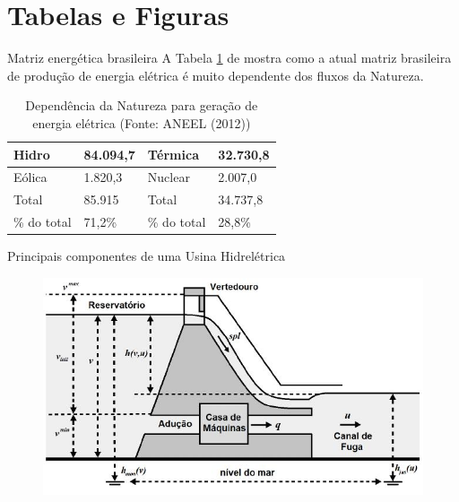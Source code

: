 \documentclass{beamer}
\begin{document}
\section{Tabelas e Figuras}

\begin{frame}{Matriz energética brasileira}
  A Tabela \ref{table:dependenciaNatureza2012} de \cite{junior1998} mostra como a atual matriz brasileira de produção de energia elétrica é muito dependente dos fluxos da Natureza.
  
  \begin{table}
  \caption{Dependência da Natureza para geração de energia elétrica (Fonte: ANEEL (2012))}
  \label{table:dependenciaNatureza2012}
  \begin{tabular}{|l|l|l|l|}
      \hline
      Hidro       & 84.094,7   & Térmica      & 32.730,8  \\ \hline
      Eólica      & 1.820,3    & Nuclear      & 2.007,0    \\ \hline
      Total       & 85.915     & Total        & 34.737,8  \\ \hline
      \% do total & 71,2\%     & \% do total  & 28,8\%    \\ \hline
  \end{tabular}
  \end{table}
\end{frame}

\begin{frame}{Principais componentes de uma Usina Hidrelétrica}
  
  \begin{figure}
    \centering
    \includegraphics[width=\textwidth]{./fig/Componentes-usinas-hidreletricas.jpg}
    \label{fig:componentesUsinasHidreletricas}
  \end{figure}
\end{frame}
\end{document}
